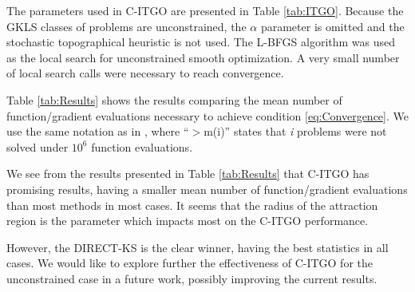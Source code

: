 The parameters used in C-ITGO are presented in Table \ref{tab:ITGO}. Because the GKLS classes of problems are unconstrained, the $\alpha$ parameter is omitted and the stochastic topographical heuristic is not used. The L-BFGS algorithm was used as the local search for unconstrained smooth optimization. A very small number of local search calls were necessary to reach convergence.



Table \ref{tab:Results} shows the results comparing the mean number of function/gradient evaluations necessary to achieve condition \ref{eq:Convergence}. We use the same notation as in \cite{NAT}, where “$>$m(i)” states that \textit{i} problems were not solved under $10^6$ function evaluations.




We see from the results presented in Table \ref{tab:Results} that C-ITGO has promising results, having a smaller mean number of function/gradient evaluations than most methods in most cases. It seems that the radius of the attraction region is the parameter which impacts most on the C-ITGO performance.

However, the DIRECT-KS is the clear winner, having the best statistics in all cases. We would like to explore further the effectiveness of C-ITGO for the unconstrained case in a future work, possibly improving the current results.

\vspace{0.5cm}